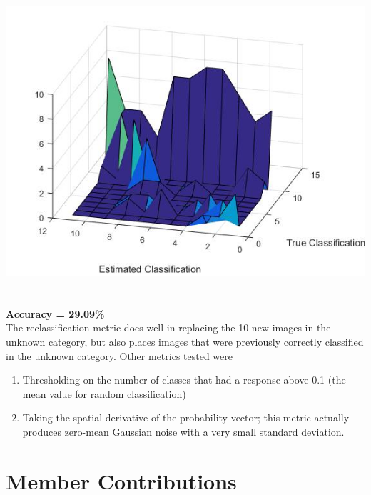 \documentclass[11pt,english]{article}
\begin{document}
\includegraphics[scale=0.6]{confexp}
~\\~\\
\textbf{Accuracy = 29.09\%}
\\
The reclassification metric does well in replacing the 10 new images in the unknown category, but also places images that were previously correctly classified in the unknown category.  Other metrics tested were
\begin{enumerate}
\item Thresholding on the number of classes that had a response above 0.1 (the mean value for random classification)
\item Taking the spatial derivative of the probability vector; this metric actually produces zero-mean Gaussian noise with a very small standard deviation.
\end{enumerate}

\section{Member Contributions}
\end{document}
